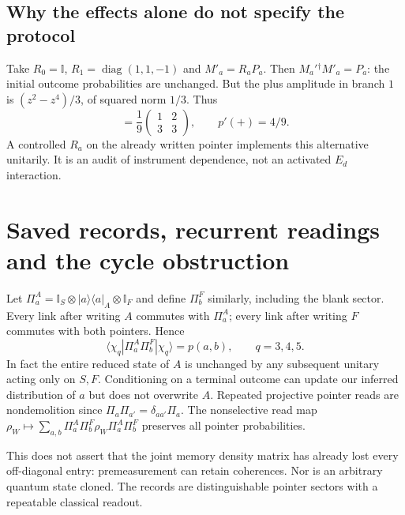 \documentclass[11pt,a4paper]{article}
\newcommand{\id}{\mathbb I}
\newcommand{\ket}[1]{|#1\rangle}
\newcommand{\bra}[1]{\langle#1|}
\newcommand{\pr}[1]{\ket{#1}\bra{#1}}
\begin{document}
\subsection*{Why the effects alone do not specify the protocol}
Take $R_0=\id$, $R_1=\operatorname{diag}(1,1,-1)$ and
$M'_a=R_aP_a$. Then $M_a'{}^\dagger M'_a=P_a$:
the initial outcome probabilities are unchanged. But the plus
amplitude in branch $1$ is $(z^2-z^4)/3$, of squared norm $1/3$.
Thus
\begin{equation}
 [p'(a,b)]=\frac19\begin{pmatrix}1&2\\3&3\end{pmatrix},
 \qquad p'(+)=4/9 .
\end{equation}
A controlled $R_a$ on the already written pointer implements this
alternative unitarily. It is an audit of instrument dependence, not
an activated $E_d$ interaction.

\newpage
\section{Saved records, recurrent readings and the cycle obstruction}
Let $\Pi_a^A=\id_S\otimes\pr a_A\otimes\id_F$ and define $\Pi_b^F$
similarly, including the blank sector. Every link after writing $A$
commutes with $\Pi_a^A$; every link after writing $F$ commutes with
both pointers. Hence
\begin{equation}
 \langle\chi_q|\Pi_a^A\Pi_b^F|\chi_q\rangle=p(a,b),
 \qquad q=3,4,5.
\end{equation}
In fact the entire reduced state of $A$ is unchanged by any subsequent
unitary acting only on $S,F$. Conditioning on a terminal outcome can
update our inferred distribution of $a$ but does not overwrite $A$.
Repeated projective pointer reads are nondemolition since
$\Pi_a\Pi_{a'}=\delta_{aa'}\Pi_a$.
The nonselective read map
$\rho_W\mapsto\sum_{a,b}\Pi_a^A\Pi_b^F\rho_W\Pi_a^A\Pi_b^F$
preserves all pointer probabilities.

This does not assert that the joint memory density matrix has already
lost every off-diagonal entry: premeasurement can retain coherences.
Nor is an arbitrary quantum state cloned. The records are distinguishable
pointer sectors with a repeatable classical readout.
\end{document}
